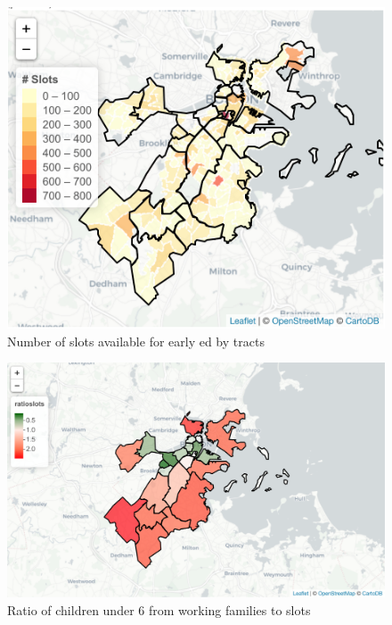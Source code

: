 \documentclass[10pt,letterpaper]{article}
\begin{document}
\begin{figure}

{\centering \includegraphics[width=1\linewidth]{fig2_capacitytractsupply} 

}

\caption{Number of slots available for early ed by tracts}\label{fig:unnamed-chunk-2}
\end{figure}

\begin{figure}

{\centering \includegraphics[width=1\linewidth]{fig3} 

}

\caption{Ratio of children under 6 from working families to slots}\label{fig:unnamed-chunk-3}
\end{figure}
\end{document}

